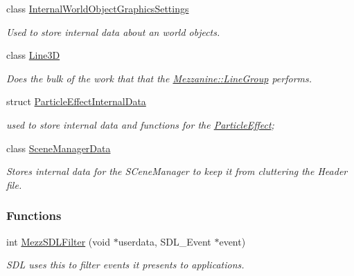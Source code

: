 \begin{DoxyCompactItemize}
class \hyperlink{classMezzanine_1_1internal_1_1InternalWorldObjectGraphicsSettings}{InternalWorldObjectGraphicsSettings}
\begin{DoxyCompactList}\small\item\em Used to store internal data about an world objects. \item\end{DoxyCompactList}\item 
class \hyperlink{classMezzanine_1_1internal_1_1Line3D}{Line3D}
\begin{DoxyCompactList}\small\item\em Does the bulk of the work that that the \hyperlink{classMezzanine_1_1LineGroup}{Mezzanine::LineGroup} performs. \item\end{DoxyCompactList}\item 
struct \hyperlink{structMezzanine_1_1internal_1_1ParticleEffectInternalData}{ParticleEffectInternalData}
\begin{DoxyCompactList}\small\item\em used to store internal data and functions for the \hyperlink{classMezzanine_1_1ParticleEffect}{ParticleEffect}; \item\end{DoxyCompactList}\item 
class \hyperlink{classMezzanine_1_1internal_1_1SceneManagerData}{SceneManagerData}
\begin{DoxyCompactList}\small\item\em Stores internal data for the SCeneManager to keep it from cluttering the Header file. \item\end{DoxyCompactList}\end{DoxyCompactItemize}
\subsubsection*{Functions}
\begin{DoxyCompactItemize}
\item 
int \hyperlink{namespaceMezzanine_1_1internal_af7f8357f11f4c0f6217cfce883184019}{MezzSDLFilter} (void $\ast$userdata, SDL\_\-Event $\ast$event)
\begin{DoxyCompactList}\small\item\em SDL uses this to filter events it presents to applications. \item\end{DoxyCompactList}\end{DoxyCompactItemize}


